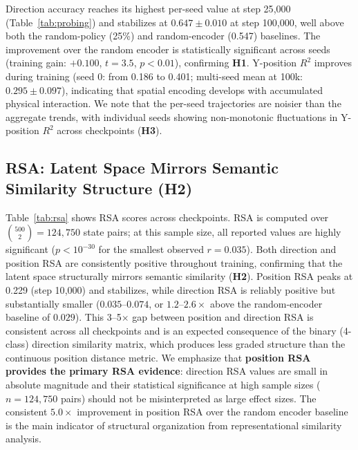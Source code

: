 \documentclass{article}
\begin{document}
Direction accuracy reaches its highest per-seed value at step 25{,}000
(Table~\ref{tab:probing}) and stabilizes at $0.647\!\pm\!0.010$ at step
100{,}000, well above both the random-policy (25\%) and random-encoder
(0.547) baselines.
The improvement over the random encoder is statistically significant
across seeds (training gain: $+0.100$, $t\!=\!3.5$, $p\!<\!0.01$), confirming \textbf{H1}.
Y-position $R^2$ improves during training (seed 0: from 0.186 to 0.401;
multi-seed mean at 100k: $0.295\!\pm\!0.097$), indicating that spatial
encoding develops with accumulated physical interaction.
We note that the per-seed trajectories are noisier than the aggregate trends,
with individual seeds showing non-monotonic fluctuations in Y-position $R^2$
across checkpoints (\textbf{H3}).

\subsection{RSA: Latent Space Mirrors Semantic Similarity Structure (H2)}

Table~\ref{tab:rsa} shows RSA scores across checkpoints.
RSA is computed over $\binom{500}{2}\!=\!124{,}750$ state pairs;
at this sample size, all reported values are highly significant
($p < 10^{-30}$ for the smallest observed $r\!=\!0.035$).
Both direction and position RSA are consistently positive throughout
training, confirming that the latent space structurally mirrors
semantic similarity (\textbf{H2}).
Position RSA peaks at 0.229 (step 10{,}000) and stabilizes,
while direction RSA is reliably positive but substantially smaller
($0.035$--$0.074$, or $1.2$--$2.6\times$ above the random-encoder baseline of $0.029$).
This 3--5$\times$ gap between position and direction RSA is consistent across
all checkpoints and is an expected consequence of the binary (4-class)
direction similarity matrix, which produces less graded structure
than the continuous position distance metric.
We emphasize that \textbf{position RSA provides the primary RSA evidence}:
direction RSA values are small in absolute magnitude and their statistical
significance at high sample sizes ($n\!=\!124{,}750$ pairs) should not
be misinterpreted as large effect sizes.
The consistent $5.0\times$ improvement in position RSA over the
random encoder baseline is the main indicator of structural organization
from representational similarity analysis.
\end{document}

